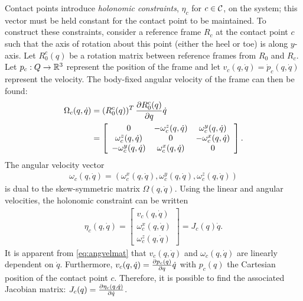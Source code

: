 Contact points introduce {\it holonomic constraints}, $\eta_{c}$ for $c \in \mathcal{C}$, on the system; this vector must be held constant for the contact point to be maintained. To construct these constraints, consider a reference frame $R_{c}$ at the contact point $c$ such that the axis of rotation about this point (either the heel or toe) is along $y$-axis. Let $R_0^c(q)$ be a rotation matrix between reference frames from $R_{0}$ and $R_{c}$. Let $p_{c} : Q \to \mathbb{R}^{3}$ represent the position of the frame and let $v_{c}(q, {\dot q}) = {\dot p}_{c}(q, {\dot q})$ represent the velocity. The body-fixed angular velocity of the frame can then be found:
\begin{align}
  \label{eq:angvelmat}
  \Omega_{c}(q, {\dot q}) &= (R_{0}^{c}(q))^{T} \, \frac{\partial{R_{0}^{c}(q)}}{\partial{q}} {\dot q}\\
  \nonumber
  &= \left[\begin{array}{c c c}
      0 & -\omega_{c}^{z}(q, {\dot q}) & \omega_{c}^{y}(q, {\dot q})\\
      \omega_{c}^{z}(q, {\dot q}) & 0 & -\omega_{c}^{x}(q, {\dot q})\\
      -\omega_{c}^{y}(q, {\dot q}) & \omega_{c}^{x}(q, {\dot q}) & 0
    \end{array}\right].
\end{align}
The angular velocity vector
\begin{align}
  \omega_{c}(q, {\dot q}) = (\omega_{c}^{x}(q, {\dot q}), \omega_{c}^{y}(q, {\dot q}), \omega_{c}^{z}(q, {\dot q}))
\end{align}
is dual to the skew-symmetric matrix $\Omega(q, {\dot q})$. Using the linear and angular velocities, the holonomic constraint can be written
\begin{align}
  \eta_{c}(q, {\dot q}) = \left[\begin{array}{c}
      v_{c}(q, {\dot q})\\
      \omega_{c}^{x}(q, {\dot q})\\
      \omega_{c}^{z}(q, {\dot q})
    \end{array}\right] =
  J_{c}(q) {\dot q}.
\end{align}
It is apparent from \eqref{eq:angvelmat} that $v_{c}(q, {\dot q})$ and $\omega_{c}(q, {\dot q})$ are linearly dependent on ${\dot q}$. Furthermore, $v_{c}(q, {\dot q}) = \frac{\partial{p_{c}(q)}}{\partial{q}} {\dot q}$ with $p_{c}(q)$ the Cartesian position of the contact point $c$. Therefore, it is possible to find the associated Jacobian matrix: $J_{c}(q) = \frac{\partial{\eta_{c}(q, {\dot q})}}{\partial{{\dot q}}}$.

